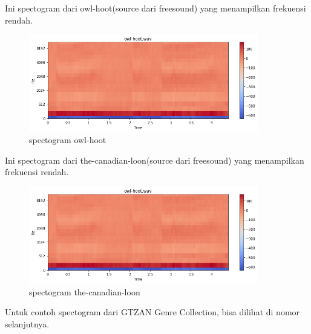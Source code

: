Ini spectogram dari owl-hoot(source dari freesound) yang menampilkan frekuensi rendah.

\begin{figure}[H]
	\centering
	\includegraphics[width=10cm]{figures/1174083/figures6/10.png}
	\caption{spectogram owl-hoot}
\end{figure}

Ini spectogram dari the-canadian-loon(source dari freesound) yang menampilkan frekuensi rendah.

\begin{figure}[H]
	\centering
	\includegraphics[width=10cm]{figures/1174083/figures6/10.png}
	\caption{spectogram the-canadian-loon}
\end{figure}

Untuk contoh spectogram dari GTZAN Genre Collection, bisa dilihat di nomor selanjutnya.

